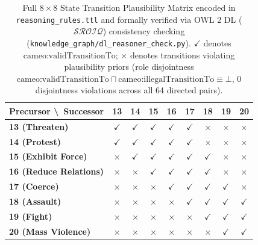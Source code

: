 \documentclass[11pt,a4paper]{article}
\begin{document}
\begin{table}[h]
\centering
\small
\caption{Full $8 \times 8$ State Transition Plausibility Matrix encoded in \texttt{reasoning\_rules.ttl} and formally verified via OWL 2 DL ($\mathcal{SROIQ}$) consistency checking (\texttt{knowledge\_graph/dl\_reasoner\_check.py}). $\checkmark$ denotes $\text{cameo:validTransitionTo}$; $\times$ denotes transitions violating plausibility priors (role disjointness $\text{cameo:validTransitionTo} \sqcap \text{cameo:illegalTransitionTo} \equiv \bot$, 0 disjointness violations across all 64 directed pairs).}
\label{tab:transition_8x8}
\begin{tabular}{lcccccccc}
\toprule
\textbf{Precursor \textbackslash\ Successor} & \textbf{13} & \textbf{14} & \textbf{15} & \textbf{16} & \textbf{17} & \textbf{18} & \textbf{19} & \textbf{20} \\
\midrule
\textbf{13 (Threaten)}          & $\checkmark$ & $\checkmark$ & $\checkmark$ & $\checkmark$ & $\checkmark$ & $\times$     & $\times$     & $\times$     \\
\textbf{14 (Protest)}           & $\checkmark$ & $\checkmark$ & $\checkmark$ & $\checkmark$ & $\checkmark$ & $\times$     & $\times$     & $\times$     \\
\textbf{15 (Exhibit Force)}     & $\times$     & $\checkmark$ & $\checkmark$ & $\checkmark$ & $\checkmark$ & $\checkmark$ & $\times$     & $\times$     \\
\textbf{16 (Reduce Relations)}  & $\times$     & $\times$     & $\checkmark$ & $\checkmark$ & $\checkmark$ & $\checkmark$ & $\times$     & $\times$     \\
\textbf{17 (Coerce)}            & $\times$     & $\times$     & $\times$     & $\checkmark$ & $\checkmark$ & $\checkmark$ & $\checkmark$ & $\times$     \\
\textbf{18 (Assault)}           & $\times$     & $\times$     & $\times$     & $\times$     & $\checkmark$ & $\checkmark$ & $\checkmark$ & $\checkmark$ \\
\textbf{19 (Fight)}             & $\times$     & $\times$     & $\times$     & $\times$     & $\times$     & $\checkmark$ & $\checkmark$ & $\checkmark$ \\
\textbf{20 (Mass Violence)}     & $\times$     & $\times$     & $\times$     & $\times$     & $\times$     & $\times$     & $\checkmark$ & $\checkmark$ \\
\bottomrule
\end{tabular}
\end{table}
\end{document}
